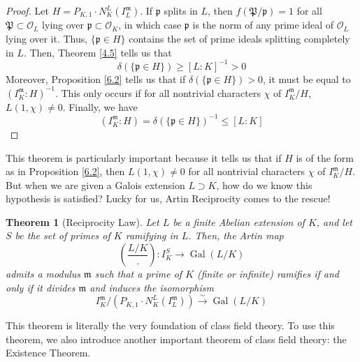 \documentclass{article}
\DeclareMathOperator{\Gal}{Gal}
\theoremstyle{plain}
\newtheorem{thm}{Theorem}
\newtheorem{cor}[thm]{Corollary}
\theoremstyle{definition}
\theoremstyle{remark}
\numberwithin{equation}{section}
\numberwithin{thm}{section}
\begin{document}
\begin{proof}
Let $H = P_{K, 1} \cdot N_{K}^{L}(I_{L}^{\mathfrak{m}})$. If $\mathfrak{p}$ splits in $L$, then $f(\mathfrak{P} / \mathfrak{p}) = 1$ for all $\mathfrak{P} \subset \mathcal{O}_L$ lying over $\mathfrak{p} \subset \mathcal{O}_K$, in which case $\mathfrak{p}$ is the norm of any prime ideal of $\mathcal{O}_L$ lying over it. Thus, $\{\mathfrak{p} \in H\}$ contains the set of prime ideals splitting completely in $L$. Then, Theorem \ref{4.5} tells us that $$\delta(\{\mathfrak{p} \in H\}) \geq [L : K]^{-1} > 0$$ Moreover, Proposition \ref{6.2} tells us that if $\delta(\{\mathfrak{p} \in H\}) > 0$, it must be equal to $(I_{K}^{\mathfrak{m}} : H)^{-1}$. This only occurs if for all nontrivial characters $\chi$ of $I_{K}^{\mathfrak{m}}/H$, $L(1, \chi) \neq 0$. Finally, we have $$(I_{K}^{\mathfrak{m}} : H) = \delta(\{\mathfrak{p} \in H\})^{-1} \leq [L : K]$$ 
\end{proof}


This theorem is particularly important because it tells us that if $H$ is of the form as in Proposition \ref{6.2}, then $L(1, \chi) \neq 0$ for all nontrivial characters $\chi$ of $I_{K}^{\mathfrak{m}}/H$. But when we are given a Galois extension $L \supset K$, how do we know this hypothesis is satisfied? Lucky for us, Artin Reciprocity comes to the rescue!

\begin{thm}[Reciprocity Law] \label{6.4}
Let $L$ be a finite Abelian extension of $K$, and let $S$ be the set of primes of $K$ ramifying in $L$. Then, the Artin map $$\left(\frac{L/K}{.}\right) : I_{K}^{S} \longrightarrow \Gal(L/K)$$ admits a modulus $\mathfrak{m}$ such that a prime of $K$ (finite or infinite) ramifies if and only if it divides $\mathfrak{m}$ and induces the isomorphism $$I_{K}^{\mathfrak{m}}/(P_{K,1}\cdot N_{K}^{L}(I_{L}^{\mathfrak{m}})) \xrightarrow{\sim} \Gal(L/K)$$
\end{thm}

This theorem is literally the very foundation of class field theory. To use this theorem, we also introduce another important theorem of class field theory: the Existence Theorem.
\end{document}
